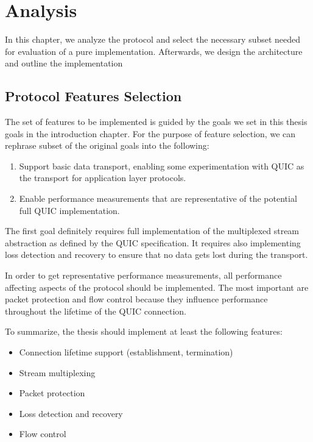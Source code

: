 \chapter{Analysis}\label{chap:03-analysis}

In this chapter, we analyze the protocol and select the necessary subset needed for evaluation of a
pure \dotnet{} implementation. Afterwards, we design the architecture and outline the implementation

\section{Protocol Features Selection}

The set of features to be implemented is guided by the goals we set in this thesis goals in the
introduction chapter. For the purpose of feature selection, we can rephrase subset of the original
goals into the following:


\begin{enumerate}

  \item Support basic data transport, enabling some experimentation with QUIC as the transport for
    application layer protocols.

  \item Enable performance measurements that are representative of the potential full QUIC
    implementation.

\end{enumerate}

The first goal definitely requires full implementation of the multiplexed stream abstraction as
defined by the QUIC specification. It requires also implementing loss detection and recovery to
ensure that no data gets lost during the transport.

In order to get representative performance measurements, all performance affecting aspects of the
protocol should be implemented. The most important are packet protection and flow control because
they influence performance throughout the lifetime of the QUIC connection.

To summarize, the thesis should implement at least the following features:

\begin{itemize}

    \item Connection lifetime support (establishment, termination)

    \item Stream multiplexing

    \item Packet protection

    \item Loss detection and recovery

    \item Flow control

\end{itemize}

